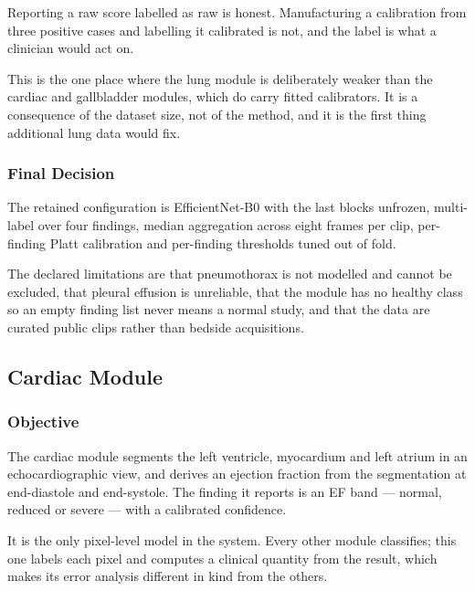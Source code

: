 \begin{keystatement}
Reporting a raw score labelled as raw is honest. Manufacturing a calibration from three
positive cases and labelling it calibrated is not, and the label is what a clinician would
act on.
\end{keystatement}

This is the one place where the lung module is deliberately weaker than the cardiac and
gallbladder modules, which do carry fitted calibrators. It is a consequence of the dataset
size, not of the method, and it is the first thing additional lung data would fix.

\subsubsection{Final Decision}

The retained configuration is EfficientNet-B0 with the last blocks unfrozen, multi-label over
four findings, median aggregation across eight frames per clip, per-finding Platt calibration
and per-finding thresholds tuned out of fold.

The declared limitations are that pneumothorax is not modelled and cannot be excluded, that
pleural effusion is unreliable, that the module has no healthy class so an empty finding list
never means a normal study, and that the data are curated public clips rather than bedside
acquisitions.

\subsection{Cardiac Module}
\label{subsec:cardiac-module}

\subsubsection{Objective}

The cardiac module segments the left ventricle, myocardium and left atrium in an
echocardiographic view, and derives an ejection fraction from the segmentation at end-diastole
and end-systole. The finding it reports is an EF band --- normal, reduced or severe --- with a
calibrated confidence.

It is the only pixel-level model in the system. Every other module classifies; this one labels
each pixel and computes a clinical quantity from the result, which makes its error analysis
different in kind from the others.

